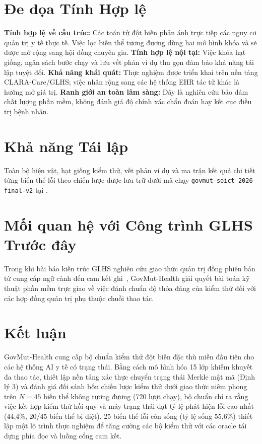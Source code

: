 \documentclass[11pt]{article}
\begin{document}
\section{Đe dọa Tính Hợp lệ}
\textbf{Tính hợp lệ về cấu trúc:} Các toán tử đột biến phản ánh trực tiếp các nguy cơ quản trị y tế thực tế. Việc lọc biến thể tương đương dùng hai mô hình khóa và sẽ được mở rộng sang hội đồng chuyên gia.
\textbf{Tính hợp lệ nội tại:} Việc khóa hạt giống, ngân sách bước chạy và lưu vết phản ví dụ thu gọn đảm bảo khả năng tái lập tuyệt đối.
\textbf{Khả năng khái quát:} Thực nghiệm được triển khai trên nền tảng CLARA-Care/GLHS; việc nhân rộng sang các hệ thống EHR tác tử khác là hướng mở giá trị.
\textbf{Ranh giới an toàn lâm sàng:} Đây là nghiên cứu bảo đảm chất lượng phần mềm, không đánh giá độ chính xác chẩn đoán hay kết cục điều trị bệnh nhân.

\section{Khả năng Tái lập}
Toàn bộ hiện vật, hạt giống kiểm thử, vết phản ví dụ và ma trận kết quả chi tiết từng biến thể lỗi theo chiến lược được lưu trữ dưới mã chạy \texttt{govmut-soict-2026-final-v2} tại .

\section{Mối quan hệ với Công trình GLHS Trước đây}
Trong khi bài báo kiến trúc GLHS nghiên cứu giao thức quản trị đồng phiên bản từ cung cấp ngữ cảnh đến cam kết ghi~\cite{glhs}, GovMut-Health giải quyết bài toán kỹ thuật phần mềm trực giao về việc đánh chuẩn độ thỏa đáng của kiểm thử đối với các hợp đồng quản trị phụ thuộc chuỗi thao tác.

\section{Kết luận}
GovMut-Health cung cấp bộ chuẩn kiểm thử đột biến đặc thù miền đầu tiên cho các hệ thống AI y tế có trạng thái. Bằng cách mô hình hóa 15 lớp khiếm khuyết đa thao tác, thiết lập nền tảng xác thực chuyển trạng thái Merkle mật mã (Định lý 3) và đánh giá đối sánh bốn chiến lược kiểm thử dưới giao thức niêm phong trên $N = 45$ biến thể không tương đương (720 lượt chạy), bộ chuẩn chỉ ra rằng việc kết hợp kiểm thử hồi quy và máy trạng thái đạt tỷ lệ phát hiện lỗi cao nhất (44,4\%, 20/45 biến thể bị diệt). 25 biến thể lỗi còn sống (tỷ lệ sống 55,6\%) thiết lập một lộ trình thực nghiệm để tăng cường các bộ kiểm thử với các oracle tái dựng phía đọc và luồng cổng cam kết.
\end{document}
